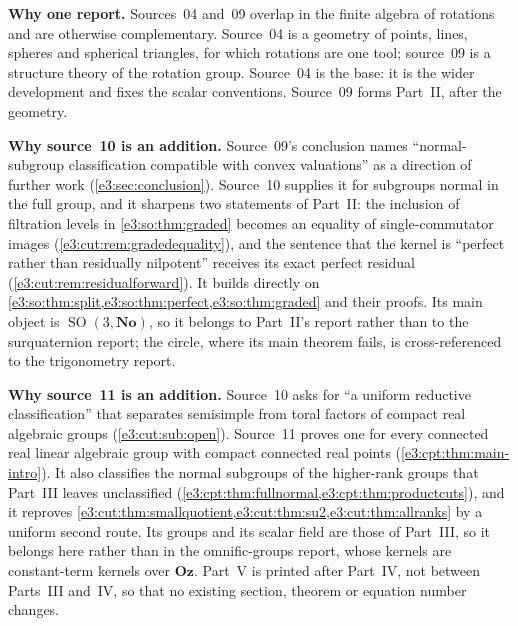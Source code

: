 \documentclass[11pt,letterpaper]{article}
\numberwithin{equation}{section}
\theoremstyle{definition}
\theoremstyle{remark}
\newcommand{\No}{\mathbf{No}}
\newcommand{\Oz}{\mathbf{Oz}}
\newcommand{\SO}{\operatorname{SO}}
\begin{document}
\textbf{Why one report.} Sources~04 and~09 overlap in the finite algebra of
rotations and are otherwise complementary. Source~04 is a geometry of points,
lines, spheres and spherical triangles, for which rotations are one tool;
source~09 is a structure theory of the rotation group. Source~04 is the base: it
is the wider development and fixes the scalar conventions. Source~09 forms
Part~II, after the geometry.

\textbf{Why source~10 is an addition.} Source~09's conclusion names
``normal-subgroup classification compatible with convex valuations'' as a
direction of further work (\cref{e3:sec:conclusion}). Source~10 supplies it for
subgroups normal in the full group, and it sharpens two statements of Part~II:
the inclusion of filtration levels in \cref{e3:so:thm:graded} becomes an
equality of single-commutator images (\cref{e3:cut:rem:gradedequality}), and the
sentence that the kernel is ``perfect rather than residually nilpotent'' receives
its exact perfect residual (\cref{e3:cut:rem:residualforward}). It builds
directly on \cref{e3:so:thm:split,e3:so:thm:perfect,e3:so:thm:graded} and their
proofs. Its main object is $\SO(3,\No)$, so it belongs to Part~II's report
rather than to the surquaternion report; the circle, where its main theorem
fails, is cross-referenced to the trigonometry report.

\textbf{Why source~11 is an addition.} Source~10 asks for ``a uniform reductive
classification'' that separates semisimple from toral factors of compact real
algebraic groups (\cref{e3:cut:sub:open}). Source~11 proves one for every
connected real linear algebraic group with compact connected real points
(\cref{e3:cpt:thm:main-intro}). It also classifies the normal subgroups of the
higher-rank groups that Part~III leaves unclassified
(\cref{e3:cpt:thm:fullnormal,e3:cpt:thm:productcuts}), and it reproves
\cref{e3:cut:thm:smallquotient,e3:cut:thm:su2,e3:cut:thm:allranks} by a
uniform second route. Its groups and its scalar field are those of Part~III, so
it belongs here rather than in the omnific-groups report, whose kernels are
constant-term kernels over $\Oz$. Part~V is printed after Part~IV, not between
Parts~III and~IV, so that no existing section, theorem or equation number
changes.
\end{document}
